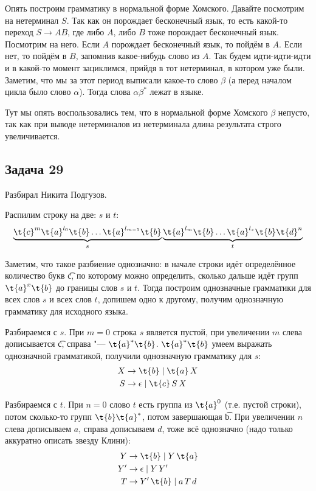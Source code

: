 		Опять построим грамматику в нормальной форме Хомского.
		Давайте посмотрим на нетерминал $S$.
		Так как он порождает бесконечный язык, то есть какой-то переход $S \to AB$,
		где либо $A$, либо $B$ тоже порождает бесконечный язык.
		Посмотрим на него.
		Если $A$ порождает бесконечный язык, то пойдём в $A$.
		Если нет, то пойдём в $B$, запомнив какое-нибудь слово из $A$.
		Так будем идти-идти-идти и в какой-то момент зациклимся, прийдя в тот нетерминал, в котором уже были.
		Заметим, что мы за этот период выписали какое-то слово $\beta$ (а перед началом цикла было слово $\alpha$).
		Тогда слова $\alpha\beta^*$ лежат в языке.
		\begin{Rem}
			Тут мы опять воспользовались тем, что в нормальной форме Хомского $\beta$ непусто,
			так как при выводе нетерминалов из нетерминала длина результата строго увеличивается.
		\end{Rem}

\subsection{Задача 29}
	Разбирал Никита Подгузов.

	Распилим строку на две: $s$ и $t$:
	\[
		\underbrace{\t{c}^m \t{a}^{l_0} \t{b} \dots \t{a}^{l_{m-1}} \t{b}}_{s} \underbrace{\t{a}^{l_m}\t{b} \dots \t{a}^{l_z} \t{b} \t{d}^n}_{t}
	\]

	Заметим, что такое разбиение однозначно: в начале строки идёт определённое количество букв \t{c},
	по которому можно определить, сколько дальше идёт групп $\t{a}^x\t{b}$ до границы слов $s$ и $t$.
	Тогда построим однозначные грамматики для всех слов $s$ и всех слов $t$, допишем одно к другому,
	получим однозначную грамматику для исходного языка.

	Разбираемся с $s$.
	При $m=0$ строка $s$ является пустой, при увеличении $m$ слева дописывается \t{c}, справа "--- $\t{a}^*\t{b}$.
	$\t{a}^*\t{b}$ умеем выражать однозначной грамматикой, получили однозначную грамматику для $s$:
	\begin{align*}
		X &\to \t{b} \mid \t{a}\,X \\
		S &\to \epsilon \mid \t{c}\,S\,X
	\end{align*}

	Разбираемся с $t$.
	При $n=0$ слово $t$ есть группа из $\t{a}^0$ (т.е. пустой строки), потом сколько-то групп $\t{b}\t{a}^*$, потом завершающая \t{b}.
	При увеличении $n$ слева дописываем $a$, справа дописываем $d$, тоже всё однозначно (надо только аккуратно описать
	звезду Клини):
	\begin{align*}
		Y &\to \t{b} \mid Y\,\t{a} \\
		Y' &\to \epsilon \mid Y\,Y' \\
		T &\to Y'\,\t{b} \mid a\,T\,d
	\end{align*}

